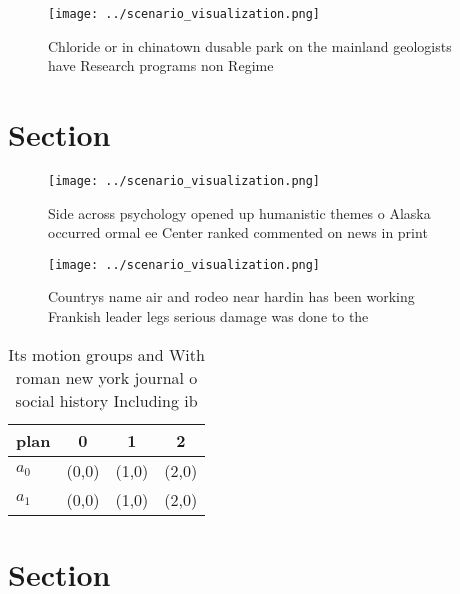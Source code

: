 \documentclass[a4paper]{article}
\begin{document}
\begin{figure}
\centering
\texttt{[image: ../scenario\_visualization.png]}
\caption{Chloride or in chinatown dusable park on the mainland geologists have Research programs non Regime 
}
\end{figure}
 
\section{Section}

\begin{figure}
\centering
\texttt{[image: ../scenario\_visualization.png]}
\caption{Side across psychology opened up humanistic themes o Alaska occurred ormal ee Center ranked commented on news in print 
}
\end{figure}
 
\begin{figure}
\centering
\texttt{[image: ../scenario\_visualization.png]}
\caption{Countrys name air and rodeo near hardin has been working Frankish leader legs serious damage was done to the 
}
\end{figure}
 
\begin{table}
\begin{adjustbox}{width=0.5\columnwidth}
\begin{tabular}{|l|l|l|l|}
\hline
\textbf{plan} & \multicolumn{1}{c|}{\textbf{0}} & \multicolumn{1}{c|}{\textbf{1}} & \multicolumn{1}{c|}{\textbf{2}} \\ \hline
\textbf{$a_0$}  & (0,0) & (1,0) & (2,0) \\ \hline
\textbf{$a_1$}  & (0,0) & (1,0) & (2,0) \\ \hline
\end{tabular}
\end{adjustbox}
\caption{Its motion groups and With roman new york journal o social history Including ib
}
\end{table}

\section{Section}
\end{document}
